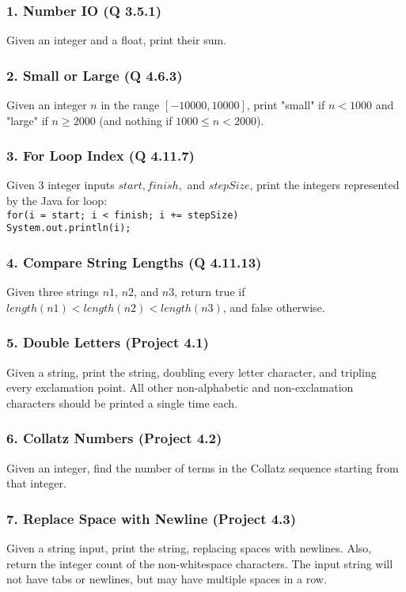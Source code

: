 \documentclass{sig-alternate}
\begin{document}
\subsubsection*{1. Number IO (Q 3.5.1)}
Given an integer and a float, print their sum.

\subsubsection*{2. Small or Large (Q 4.6.3)}
Given an integer $n$ in the range $[-10000, 10000]$, print "small" if $n < 1000$ and "large" if $n \ge 2000$ (and nothing if $1000 \le n < 2000$).

\subsubsection*{3. For Loop Index (Q 4.11.7)}
Given 3 integer inputs $start, finish,$ and $stepSize$, print the integers represented by the Java for loop: \\
\texttt{for(i = start; i < finish; i += stepSize) \\ \- \- \- \- System.out.println(i);}

\subsubsection*{4. Compare String Lengths (Q 4.11.13)}
Given three strings $n1$, $n2$, and $n3$, return true if $length(n1) < length(n2) < length(n3)$, and false otherwise.

\subsubsection*{5. Double Letters (Project 4.1)}
Given a string, print the string, doubling every letter character, and tripling every exclamation point. All other non-alphabetic and non-exclamation characters should be printed a single time each.

\subsubsection*{6. Collatz Numbers (Project 4.2)}
Given an integer, find the number of terms in the Collatz sequence starting from that integer.

\subsubsection*{7. Replace Space with Newline (Project 4.3)}
Given a string input, print the string, replacing spaces with newlines. Also, return the integer count of the non-whitespace characters. The input string will not have tabs or newlines, but may have multiple spaces in a row.
\end{document}
